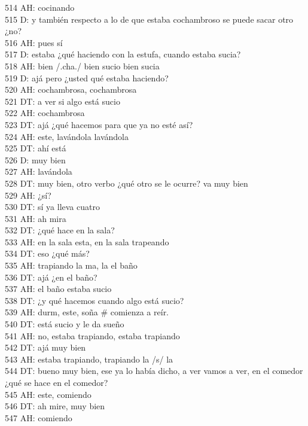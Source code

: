 514 AH: cocinando\\
515 D: y también respecto a lo de que estaba cochambroso se puede sacar otro ¿no?\\
516 AH: pues sí\\
517 D: estaba ¿qué haciendo con la estufa, cuando estaba sucia?\\
518 AH: bien /.cha./ bien sucio bien sucia\\
519 D: ajá pero ¿usted qué estaba haciendo?\\
520 AH: cochambrosa, cochambrosa\\
521 DT: a ver si algo está sucio\\
522 AH: cochambrosa\\
523 DT: ajá ¿qué hacemos para que ya no esté así?\\
524 AH: este, lavándola lavándola\\
525 DT: ahí está\\
526 D: muy bien\\
527 AH: lavándola\\
528 DT: muy bien, otro verbo ¿qué otro se le ocurre? va muy bien\\
529 AH: ¿sí?\\
530 DT: sí ya lleva cuatro\\
531 AH: ah mira\\
532 DT: ¿qué hace en la sala?\\
533 AH: en la sala esta, en la sala trapeando\\
534 DT: eso ¿qué más?\\
535 AH: trapiando la ma, la el baño\\
536 DT: ajá ¿en el baño?\\
537 AH: el baño estaba sucio\\
538 DT: ¿y qué hacemos cuando algo está sucio?\\
539 AH: durm, este, soña \# comienza a reír.\\
540 DT: está sucio y le da sueño\\
541 AH: no, estaba trapiando, estaba trapiando\\
542 DT: ajá muy bien\\
543 AH: estaba trapiando, trapiando la /s/ la\\
544 DT: bueno muy bien, ese ya lo había dicho, a ver vamos a ver, en el comedor ¿qué se hace en el comedor?\\
545 AH: este, comiendo\\
546 DT: ah mire, muy bien\\
547 AH: comiendo\\
